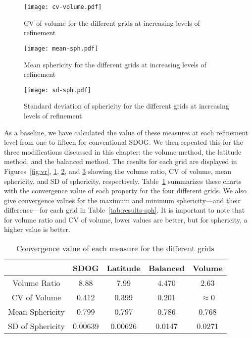 \begin{figure}[p!]
	\centering
	\texttt{[image: cv-volume.pdf]}
	\caption[Graph of CV of volume for the different grids]{
		CV of volume for the different grids at increasing levels of refinement
	}
	\label{fig:cv}
\end{figure}


\begin{figure}[p!]
	\centering
	\texttt{[image: mean-sph.pdf]}
	\caption[Graph of mean sphericity for the different grids]{
		Mean sphericity for the different grids at increasing levels of refinement
	}
	\label{fig:sph}
\end{figure}


\begin{figure}[p!]
	\centering
	\texttt{[image: sd-sph.pdf]}
	\caption[Graph of SD of sphericity for the different grids]{
		Standard deviation of sphericity for the different grids at increasing levels of refinement
	}
	\label{fig:sd-sph}
\end{figure}


As a baseline, we have calculated the value of these measures at each refinement level from one to fifteen for conventional SDOG.
We then repeated this for the three modifications discussed in this chapter: the volume method, the latitude method, and the balanced method.
The results for each grid are displayed in Figures~\ref{fig:vr}, \ref{fig:cv}, \ref{fig:sph}, and \ref{fig:sd-sph} showing the volume ratio, CV of volume, mean sphericity, and SD of sphericity, respectively.
Table~\ref{tab:results} summarizes these charts with the convergence value of each property for the four different grids.
We also give convergence values for the maximum and minimum sphericity---and their difference---for each grid in Table~\ref{tab:results-sph}.
It is important to note that for volume ratio and CV of volume, lower values are better, but for sphericity, a higher value is better.


\begin{table}[htp!]
	\centering
	\caption[Convergence values of measures for the different grids]{
		Convergence value of each measure for the different grids
	}
	\begin{tabular}{@{} c c c c c @{}}
		\toprule
		& SDOG    & Latitude & Balanced & Volume   \\ \midrule
		Volume Ratio     & 8.88    & 7.99     & 4.470    & 2.63     \\
		CV of Volume     & 0.412   & 0.399    & 0.201    & $\approx$0 \\
		Mean Sphericity  & 0.799   & 0.797    & 0.786    & 0.768    \\
		SD of Sphericity & 0.00639 & 0.00626  & 0.0147   & 0.0271   \\ \bottomrule
	\end{tabular}
	\label{tab:results}
\end{table}


